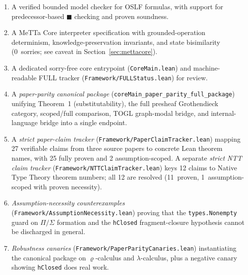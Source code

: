 \documentclass[]{article}
\newcommand{\code}[1]{\texttt{#1}}
\newcommand{\rhocalc}{\ensuremath{\varrho}}
\newcommand{\Bx}{\ensuremath{\blacksquare}}
\newcommand{\OSLF}{\textup{OSLF}}
\begin{document}
\begin{enumerate}
\item A verified bounded model checker for \OSLF{} formulas, with support for
  predecessor-based $\Bx$ checking and proven soundness.
\item A MeTTa Core interpreter specification with grounded-operation
  determinism, knowledge-preservation invariants, and state bisimilarity
  (0~sorries; see caveat in Section~\ref{sec:mettacore}).
\item A dedicated sorry-free core entrypoint (\code{CoreMain.lean}) and
  machine-readable FULL tracker (\code{Framework/FULLStatus.lean}) for review.
\item A \emph{paper-parity canonical package}
  (\code{coreMain\_paper\_parity\_full\_package}) unifying Theorem~1
  (substitutability), the full presheaf Grothendieck category, scoped/full
  comparison, TOGL graph-modal bridge, and internal-language bridge into a
  single endpoint.
\item A \emph{strict paper-claim tracker}
  (\code{Framework/PaperClaimTracker.lean}) mapping 27 verifiable claims from
  three source papers to concrete Lean theorem names, with 25 fully proven and
  2 assumption-scoped.  A separate \emph{strict NTT claim tracker}
  (\code{Framework/NTTClaimTracker.lean}) keys 12 claims to Native Type
  Theory theorem numbers; all 12 are resolved (11~proven, 1~assumption-scoped
  with proven necessity).
\item \emph{Assumption-necessity counterexamples}
  (\code{Framework/AssumptionNecessity.lean}) proving that the
  \code{types.Nonempty} guard on $\Pi/\Sigma$ formation and the
  \code{hClosed} fragment-closure hypothesis cannot be discharged in general.
\item \emph{Robustness canaries} (\code{Framework/PaperParityCanaries.lean})
  instantiating the canonical package on \rhocalc{}-calculus and $\lambda$-calculus,
  plus a negative canary showing \code{hClosed} does real work.
\end{enumerate}
\end{document}
